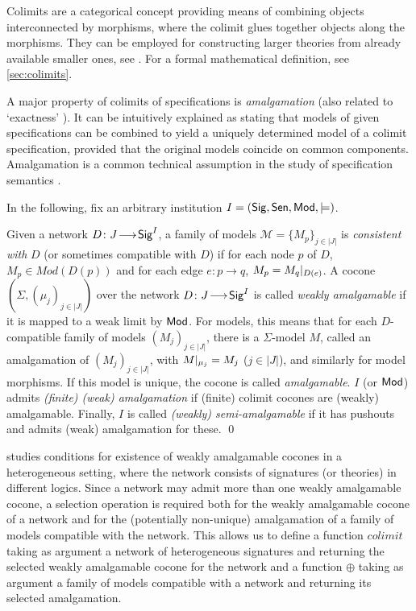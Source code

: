 \documentclass[10pt, a4paper]{isov2}
\newcommand{\Sig}{\mathsf{Sig}}
\begin{document}
Colimits are a categorical concept providing means of
combining objects interconnected by morphisms, where the colimit
glues together objects along the morphisms.
They can be employed for constructing larger theories from already available 
smaller ones, see \cite{GoguenBurstall92}. For a formal mathematical definition,
see \ref{sec:colimits}.


A major property of colimits of specifications is \emph{amalgamation} (also related to `exactness' \cite{DGS91}). It can be intuitively explained as 
stating that models of given
specifications can be combined to yield a uniquely determined model of
a colimit specification, provided that the original models coincide on
common components. Amalgamation is a common technical assumption in the 
study of specification semantics
\cite{STbook}.

In the following, fix an arbitrary institution
$I=(\Sig,\Sen,\Mod,\models)$.  

\begin{definition}
Given a network $D\map{J}{\Sig^I}$, 
a family of models $\mathcal{M} = \{M_p\}_{j\in |J|}$ is
\emph{consistent with} $D$ (or sometimes compatible with $D$) 
if for each node $p$ of $D$, $M_p \in Mod(D(p))$ and
for each edge $e:p\rightarrow q$, $M_p = M_q|_{D(e)}$.
  A cocone
$(\Sigma,(\mu_j)_{j\in|J|})$ over the network $D\map{J}{\Sig^I}$ is
called \emph{weakly amalgamable} if it is mapped to a weak limit by $\mathsf{Mod}$.
For models, this means that for each $D$-compatible family of
models $(M_j)_{j\in|J|}$, there is a $\Sigma$-model $M$, called an amalgamation of 
 $(M_j)_{j\in|J|}$,
with
$M|_{\mu_j}=M_j$ ($j\in|J|$), and similarly for model morphisms.
 If this model is unique, the cocone
is called \emph{amalgamable}. 
$I$ (or $\mathsf{Mod}$) admits \emph{(finite) (weak)
amalgamation} if (finite) colimit cocones are (weakly) amalgamable.
Finally, $I$ is called \emph{(weakly) semi-amalgamable} if 
it has pushouts and admits (weak) amalgamation for these.
\qed\end{definition}

\cite{weakcol} studies conditions for existence of weakly amalgamable cocones
in a heterogeneous setting, where the network consists of signatures (or theories)
in different logics. Since a network may admit more than one weakly amalgamable cocone,
a selection operation is required both for the weakly amalgamable cocone of a network 
and for the (potentially non-unique) amalgamation of a family of models compatible with the
network. This allows us to define a function
$colimit$ taking as argument a network of heterogeneous signatures and
returning the selected weakly amalgamable cocone for the network and
a function $\oplus$ taking as argument a family of models compatible with a network
and returning its selected amalgamation.
\end{document}
